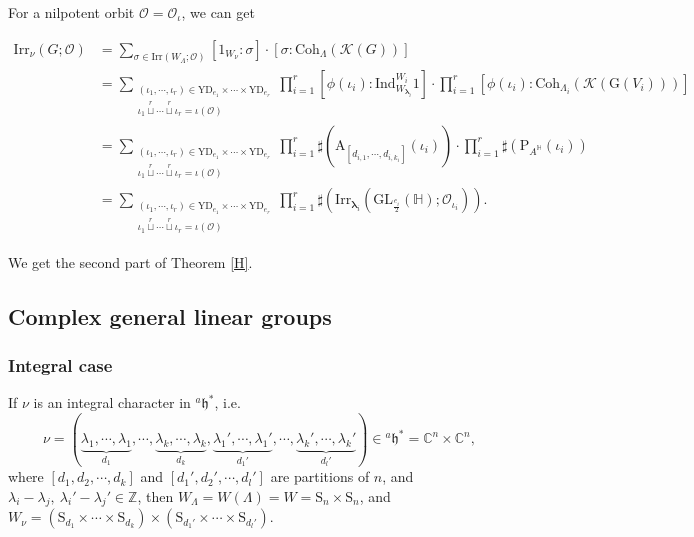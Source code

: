 \documentclass[12pt, a4paper]{amsart}
\numberwithin{equation}{section}
\newcommand{\blam}{{\boldsymbol{\lambda}}}
\newcommand{\BC}{{\mathbb {C}}}
\newcommand{\BH}{{\mathbb {H}}}
\newcommand{\BZ}{{\mathbb {Z}}}
\newcommand{\CK}{{\mathcal {K}}}
\newcommand{\CO}{{\mathcal {O}}}
\newcommand{\fh}{\mathfrak{h}}
\newcommand{\GL}{{\mathrm{GL}}}
\newcommand{\G}{{\mathrm{G}}}
\newcommand{\Ind}{{\mathrm{Ind}}}
\newcommand{\Irr}{{\mathrm{Irr}}}
\begin{document}
For a nilpotent orbit $\CO = \CO_{\iota}$, we can get

\begin{align}
    \Irr_{\nu}(G;\CO) & = \sum_{\sigma \in \Irr(W_\Lambda;\CO)}[1_{W_\nu}:\sigma]\cdot[\sigma:\mathrm{Coh}_{\Lambda}(\CK(G))]\\
    & = \sum_{\substack{(\iota_1,\cdots,\iota_r) \in \mathrm{YD}_{e_1} \times \cdots \times \mathrm{YD}_{e_r} \\ \iota_1 \mathop{\sqcup}\limits^r \cdots  \mathop{\sqcup}\limits^r \iota_r = \iota(\CO)}}\prod_{i=1}^r [\phi(\iota_i): \Ind_{W_{\blam_i}}^{W_i}1]\cdot \prod_{i=1}^r[\phi(\iota_i):\mathrm{Coh}_{\Lambda_i}(\CK(\G(V_i)))]\\
    & = \sum_{\substack{(\iota_1,\cdots,\iota_r) \in \mathrm{YD}_{e_1} \times \cdots \times \mathrm{YD}_{e_r} \\ \iota_1 \mathop{\sqcup}\limits^r \cdots  \mathop{\sqcup}\limits^r \iota_r = \iota(\CO)}} \prod_{i=1}^{r}\sharp(\mathrm{A}_{[d_{i,1}, \cdots,d_{i,k_i}]}(\iota_i)) \cdot \prod_{i=1}^r \sharp(\mathrm{P}_{A^\BH}(\iota_i))\\
    & = \sum_{\substack{(\iota_1,\cdots,\iota_r) \in \mathrm{YD}_{e_1} \times \cdots \times \mathrm{YD}_{e_r} \\ \iota_1 \mathop{\sqcup}\limits^r \cdots  \mathop{\sqcup}\limits^r \iota_r = \iota(\CO)}} \prod_{i=1}^r \sharp(\Irr_{\blam_i}(\GL_{\frac{e_i}{2}}(\BH);\CO_{\iota_i})).
\end{align}

We get the second part of Theorem \ref{H}.










\subsection{Complex general linear groups}

\subsubsection{Integral case}
If $\nu$ is an integral character in $^{a}\fh^*$, i.e. 
$$\nu =  (\underbrace{\lambda_1, \cdots, \lambda_1}_{d_1}, \cdots, \underbrace{\lambda_k, \cdots, \lambda_k}_{d_k}, \underbrace{\lambda_1', \cdots, \lambda_1'}_{d_1'}, \cdots, \underbrace{\lambda_k', \cdots, \lambda_k'}_{d_{l}'} ) \in {^{a}\fh^*} = \BC^n \times \BC^n,$$ 
where $[d_1,d_2,\cdots,d_k]$ and $[d_1',d_2',\cdots,d_l']$ are partitions of $n$, and $\lambda_i - \lambda_j, \ \lambda_i' - \lambda_j' \in \BZ$, then $W_{\Lambda} =W(\Lambda) = W = \mathrm{S}_n \times \mathrm{S}_n$, and $W_\nu = (\mathrm{S}_{d_1} \times \cdots \times \mathrm{S}_{d_k}) \times (\mathrm{S}_{d_1'} \times \cdots \times \mathrm{S}_{d_l'})$. 
\end{document}
